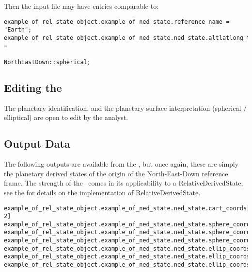 Then the input file may have entries comparable to:
\begin{verbatim}
example_of_rel_state_object.example_of_ned_state.reference_name = "Earth";
example_of_rel_state_object.example_of_ned_state.ned_state.altlatlong_type = 
                                                      NorthEastDown::spherical;
\end{verbatim}


\subsection{Editing the \NEDDesc}
The planetary identification, and the planetary surface interpretation (spherical / elliptical) are open to edit by the analyst.

\subsection{Output Data}
The following outputs are available from the \NEDDesc, but once again, these are simply the planetary derived states of the origin of the North-East-Down reference frame.  The strength of the \NEDDesc\ comes in its applicability to a RelativeDerivedState; see the  for details on the implementation of RelativeDerivedState.
\begin{verbatim}
example_of_rel_state_object.example_of_ned_state.ned_state.cart_coords[0-2]
example_of_rel_state_object.example_of_ned_state.ned_state.sphere_coords.altitude
example_of_rel_state_object.example_of_ned_state.ned_state.sphere_coords.latitude
example_of_rel_state_object.example_of_ned_state.ned_state.sphere_coords.longitude
example_of_rel_state_object.example_of_ned_state.ned_state.ellip_coords.altitude
example_of_rel_state_object.example_of_ned_state.ned_state.ellip_coords.latitude
example_of_rel_state_object.example_of_ned_state.ned_state.ellip_coords.longitude
\end{verbatim}

